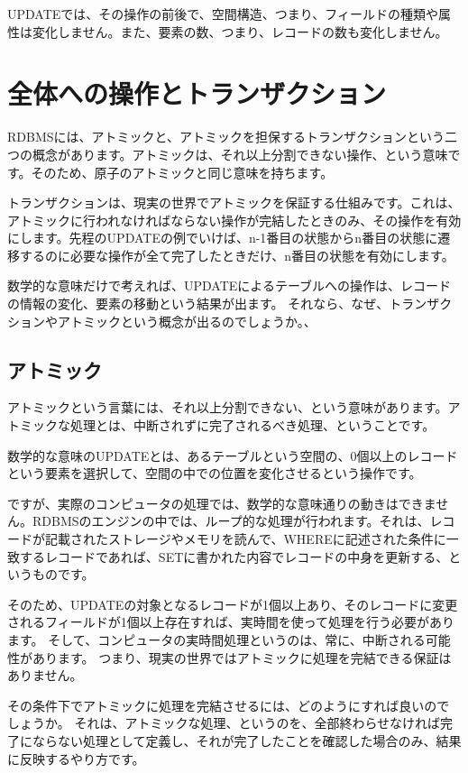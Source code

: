 UPDATEでは、その操作の前後で、空間構造、つまり、フィールドの種類や属性は変化しません。また、要素の数、つまり、レコードの数も変化しません。

\section{全体への操作とトランザクション}

RDBMSには、アトミックと、アトミックを担保するトランザクションという二つの概念があります。アトミックは、それ以上分割できない操作、という意味です。そのため、原子のアトミックと同じ意味を持ちます。

トランザクションは、現実の世界でアトミックを保証する仕組みです。これは、アトミックに行われなければならない操作が完結したときのみ、その操作を有効にします。先程のUPDATEの例でいけば、n-1番目の状態からn番目の状態に遷移するのに必要な操作が全て完了したときだけ、n番目の状態を有効にします。

数学的な意味だけで考えれば、UPDATEによるテーブルへの操作は、レコードの情報の変化、要素の移動という結果が出ます。
それなら、なぜ、トランザクションやアトミックという概念が出るのでしょうか。、

\subsection{アトミック}
アトミックという言葉には、それ以上分割できない、という意味があります。アトミックな処理とは、中断されずに完了されるべき処理、ということです。

数学的な意味のUPDATEとは、あるテーブルという空間の、0個以上のレコードという要素を選択して、空間の中での位置を変化させるという操作です。

ですが、実際のコンピュータの処理では、数学的な意味通りの動きはできません。RDBMSのエンジンの中では、ループ的な処理が行われます。それは、レコードが記載されたストレージやメモリを読んで、WHEREに記述された条件に一致するレコードであれば、SETに書かれた内容でレコードの中身を更新する、というものです。

そのため、UPDATEの対象となるレコードが1個以上あり、そのレコードに変更されるフィールドが1個以上存在すれば、実時間を使って処理を行う必要があります。
そして、コンピュータの実時間処理というのは、常に、中断される可能性があります。
つまり、現実の世界ではアトミックに処理を完結できる保証はありません。

その条件下でアトミックに処理を完結させるには、どのようにすれば良いのでしょうか。
それは、アトミックな処理、というのを、全部終わらせなければ完了にならない処理として定義し、それが完了したことを確認した場合のみ、結果に反映するやり方です。

